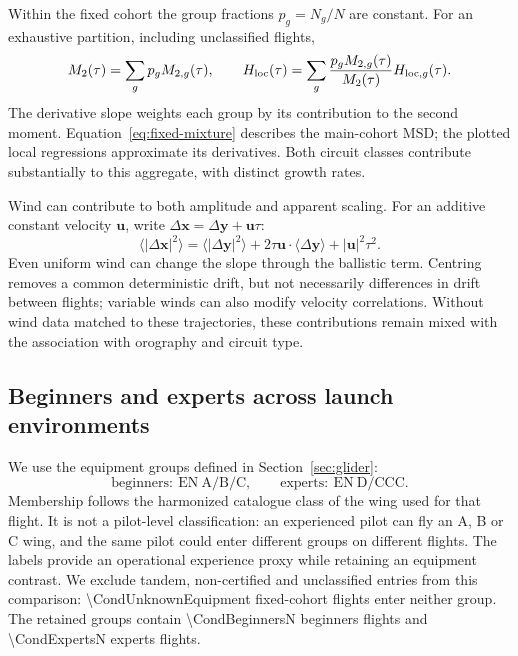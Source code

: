 Within the fixed cohort the group fractions $p_g=N_g/N$ are constant. For an
exhaustive partition, including unclassified flights,
\begin{equation}
 M_2(\tau)=\sum_g p_g M_{2,g}(\tau),\qquad
 H_{\rm loc}(\tau)=\sum_g
 \frac{p_gM_{2,g}(\tau)}{M_2(\tau)}H_{{\rm loc},g}(\tau).
 \label{eq:fixed-mixture}
\end{equation}
The derivative slope weights each group by its contribution to the second moment.
Equation~\eqref{eq:fixed-mixture} describes the main-cohort MSD; the plotted local
regressions approximate its derivatives. Both circuit classes contribute substantially
to this aggregate, with distinct growth rates.

Wind can contribute to both amplitude and apparent scaling. For an additive constant
velocity $\boldsymbol u$, write $\Delta\boldsymbol x=\Delta\boldsymbol y+\boldsymbol u\tau$:
\begin{equation}
 \langle|\Delta\boldsymbol x|^2\rangle
 =\langle|\Delta\boldsymbol y|^2\rangle
 +2\tau\boldsymbol u\cdot\langle\Delta\boldsymbol y\rangle+|\boldsymbol u|^2\tau^2.
 \label{eq:fixed-wind}
\end{equation}
Even uniform wind can change the slope through the ballistic term. Centring removes
a common deterministic drift, but not necessarily differences in drift between
flights; variable winds can also modify velocity correlations. Without wind data
matched to these trajectories, these contributions remain mixed with the
association with orography and circuit type.
\FloatBarrier
\subsection{Beginners and experts across launch environments}
\label{sec:conditional-equipment}

We use the equipment groups defined in Section~\ref{sec:glider}:
\[
 \text{beginners}:\ \mathrm{EN\ A/B/C},\qquad
 \text{experts}:\ \mathrm{EN\ D/CCC}.
\]
Membership follows the harmonized catalogue class of the wing used for that
flight. It is not a pilot-level classification: an experienced pilot can fly an
A, B or C wing, and the same pilot could enter different groups on different
flights. The labels provide an operational experience proxy while retaining
an equipment contrast. We exclude tandem, non-certified and unclassified entries
from this comparison: \num{\CondUnknownEquipment} fixed-cohort flights enter neither
group. The retained groups contain \num{\CondBeginnersN} beginners flights and
\num{\CondExpertsN} experts flights.

